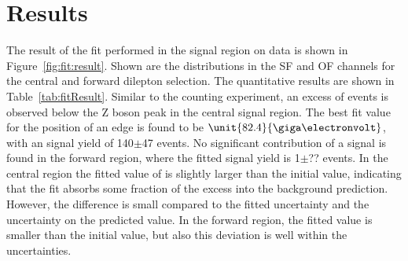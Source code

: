 \newpage

\section{Results}
The result of the fit performed in the signal region on data is shown in Figure~\ref{fig:fit:result}. Shown are the \mll distributions in the SF and OF channels for the central and forward dilepton selection. The quantitative results are shown in Table~\ref{tab:fitResult}. Similar to the counting experiment, an excess of events is observed below the Z boson peak in the central signal region. The best fit value for the position of an edge is found to be $\unit{82.4}{\giga\electronvolt}$, with an signal yield of 140$\pm$47 events. No significant contribution of a signal is found in the forward region, where the fitted signal yield is 1$\pm$?? events. In the central region the fitted value of \Rsfof is slightly larger than the initial value, indicating that the fit absorbs some fraction of the excess into the background prediction. However, the difference is small compared to the fitted uncertainty and the uncertainty on the predicted value. In the forward region, the fitted value is smaller than the initial value, but also this deviation is well within the uncertainties. 


